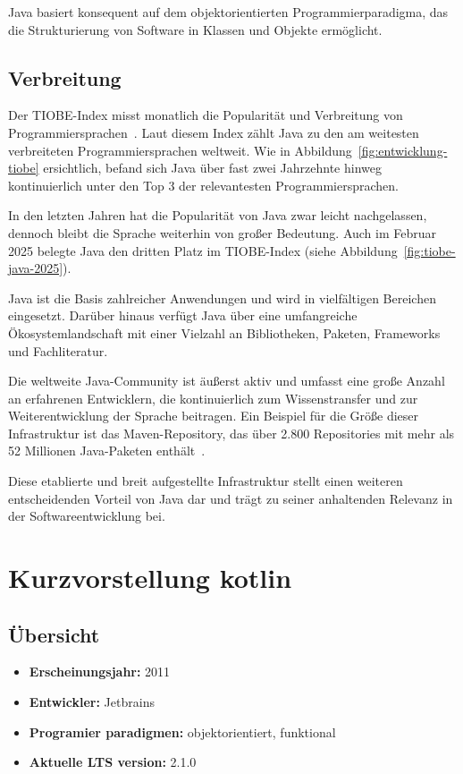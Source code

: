 \documentclass[11pt]{article}
\begin{document}
    Java basiert konsequent auf dem objektorientierten Programmierparadigma, das die Strukturierung von Software in Klassen und Objekte ermöglicht. \\

    \subsection{Verbreitung}
    Der TIOBE-Index misst monatlich die Popularität und Verbreitung von Programmiersprachen~\cite{tiobe}.
    Laut diesem Index zählt Java zu den am weitesten verbreiteten Programmiersprachen weltweit.
    Wie in Abbildung~\ref{fig:entwicklung-tiobe} ersichtlich, befand sich Java über fast zwei Jahrzehnte hinweg
    kontinuierlich unter den Top 3 der relevantesten Programmiersprachen.

    In den letzten Jahren hat die Popularität von Java zwar leicht nachgelassen, dennoch bleibt die Sprache weiterhin
    von großer Bedeutung.
    Auch im Februar 2025 belegte Java den dritten Platz im TIOBE-Index
    (siehe Abbildung~\ref{fig:tiobe-java-2025}).

    Java ist die Basis zahlreicher Anwendungen und wird in vielfältigen Bereichen eingesetzt.
    Darüber hinaus
    verfügt Java über eine umfangreiche Ökosystemlandschaft mit einer Vielzahl an Bibliotheken, Paketen,
    Frameworks und Fachliteratur.

    Die weltweite Java-Community ist äußerst aktiv und umfasst eine große Anzahl an erfahrenen Entwicklern,
    die kontinuierlich zum Wissenstransfer und zur Weiterentwicklung der Sprache beitragen.
    Ein Beispiel für die Größe dieser Infrastruktur ist das Maven-Repository, das über 2.800 Repositories mit mehr als 52 Millionen Java-Paketen
    enthält~\cite{maven}.

    Diese etablierte und breit aufgestellte Infrastruktur stellt einen weiteren entscheidenden Vorteil von Java dar und
    trägt zu seiner anhaltenden Relevanz in der Softwareentwicklung bei.\\


    \section{Kurzvorstellung kotlin}

    \subsection{Übersicht}
    \begin{itemize}
        \item \textbf{Erscheinungsjahr:} 2011
        \item \textbf{Entwickler:} Jetbrains
        \item \textbf{Programier paradigmen:} objektorientiert, funktional
        \item \textbf{Aktuelle LTS version:} 2.1.0
    \end{itemize}
\end{document}
